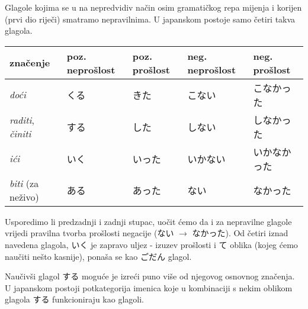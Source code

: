 
\author{Tomislav Mamić}

	
	
	Glagole kojima se u na nepredvidiv način osim gramatičkog repa mijenja i korijen (prvi dio riječi) smatramo nepravilnima. U japanskom postoje samo četiri takva glagola.
	
	\begin{table}[h]
		\centering
		\begin{tabular}{l l l l l}\toprule[2pt]
			značenje & poz. neprošlost & poz. prošlost & neg. neprošlost & neg. prošlost\\
			\midrule
			\textit{doći} & くる & きた & こない & こなかった\\
			\textit{raditi}, \textit{činiti} & する & した & しない & しなかった\\
			\textit{ići} & いく & いった & いかない & いかなかった\\
			\textit{biti} (za neživo) & ある & あった & ない & なかった\\
			\bottomrule[2pt]
		\end{tabular}
	\end{table}

	Usporedimo li predzadnji i zadnji stupac, uočit ćemo da i za nepravilne glagole vrijedi pravilna tvorba prošlosti negacije (ない $\rightarrow$ なかった). Od četiri iznad navedena glagola, いく je zapravo uljez - izuzev prošlosti i て oblika (kojeg ćemo naučiti nešto kasnije), ponaša se kao ごだん glagol.
	
	
	Naučivši glagol する moguće je izreći puno više od njegovog osnovnog značenja. U japanskom postoji potkategorija imenica koje u kombinaciji s nekim oblikom glagola する funkcioniraju kao glagoli.
	
	\begin{reibun}
	\end{reibun}
	
